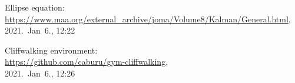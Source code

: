 \begin{thebibliography}{9}

Ellipse equation:\\
\url{https://www.maa.org/external_archive/joma/Volume8/Kalman/General.html},\\
2021.~Jan~6., 12:22

Cliffwalking environment:\\
\url{https://github.com/caburu/gym-cliffwalking},\\
2021.~Jan~6., 12:26

\end{thebibliography}
